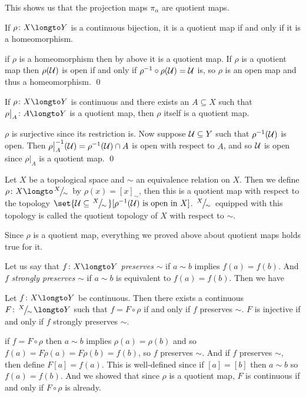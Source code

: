 This shows us that the projection maps $\pi_\alpha$ are quotient maps.

\bprop

    If $\rho\colon X\longto Y$ is a continuous bijection, it is a quotient map if and only if it is a homeomorphism.

\eprop

\Proof if $\rho$ is a homeomorphism then by above it is a quotient map.
If $\rho$ is a quotient map then $\rho({\cal U})$ is open if and only if $\rho^{-1}\circ\rho({\cal U})={\cal U}$ is, so $\rho$ is an open map and thus a homeomorphism.
\qed

\bprop

    If $\rho\colon X\longto Y$ is continuous and there exists an $A\subseteq X$ such that $\rho\bigl|_A\colon A\longto Y$ is a quotient map, then $\rho$ itself is a quotient map.

\eprop

\Proof $\rho$ is surjective since its restriction is.
Now suppose ${\cal U}\subseteq Y$ such that $\rho^{-1}({\cal U})$ is open.
Then $\rho\bigl|_A^{-1}({\cal U})=\rho^{-1}({\cal U})\cap A$ is open with respect to $A$, and so ${\cal U}$ is open since $\rho\bigl|_A$ is a quotient map.
\qed

\bdefn

    Let $X$ be a topological space and $\sim$ an equivalence relation on $X$.
    Then we define $\rho\colon X\longto\slfrac X\sim$ by $\rho(x)=[x]_{\sim}$, then this is a quotient map with respect to the topology
    $\set{\U\subseteq\slfrac X\sim}[\hbox{$\rho^{-1}(\U)$ is open in $X$}]$.
    $\slfrac X\sim$ equipped with this topology is called the {\emphcolor quotient topology} of $X$ with respect to $\sim$.

\edefn

Since $\rho$ is a quotient map, everything we proved above about quotient maps holds true for it.

Let us say that $f\colon X\longto Y$ {\it preserves} $\sim$ if $a\sim b$ implies $f(a)=f(b)$.
And $f$ {\it strongly preserves} $\sim$ if $a\sim b$ is equivalent to $f(a)=f(b)$.
Then we have

\bthrm

    Let $f\colon X\longto Y$ be continuous.
    Then there exists a continuous $F\colon\slfrac X\sim\longto Y$ such that $f=F\circ\rho$ if and only if $f$ preserves $\sim$.
    $F$ is injective if and only if $f$ strongly preserves $\sim$.

\ethrm

\Proof if $f=F\circ\rho$ then $a\sim b$ implies $\rho(a)=\rho(b)$ and so $f(a)=F\rho(a)=F\rho(b)=f(b)$, so $f$ preserves $\sim$.
And if $f$ preserves $\sim$, then define $F[a]=f(a)$.
This is well-defined since if $[a]=[b]$ then $a\sim b$ so $f(a)=f(b)$.
And we showed that since $\rho$ is a quotient map, $F$ is continuous if and only if $F\circ\rho$ is already.

